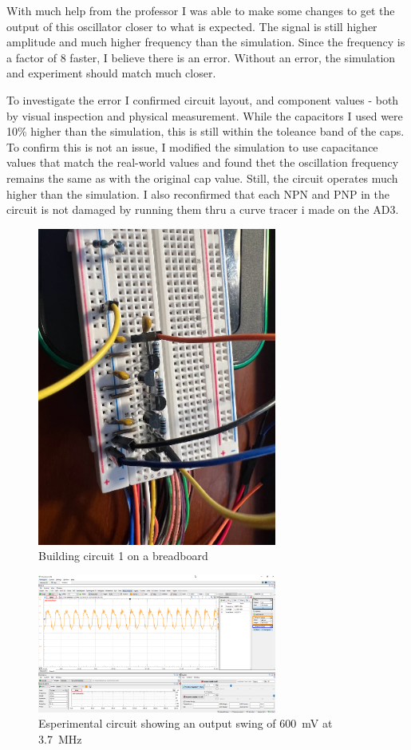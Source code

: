 \documentclass{article}
\begin{document}
	With much help from the professor I was able to make some changes to get the output of this oscillator closer to what is expected. The signal is still higher amplitude and much higher frequency than the simulation. Since the frequency is a factor of 8 faster, I believe there is an error. Without an error, the simulation and experiment should match much closer. 
	
	To investigate the error I confirmed circuit layout, and component values - both by visual inspection and physical measurement. While the capacitors I used were 10\% higher than the simulation, this is still within the toleance band of the caps. To confirm this is not an issue, I modified the simulation to use capacitance values that match the real-world values and found thet the oscillation frequency remains the same as with the original cap value. Still, the circuit operates much higher than the simulation. I also reconfirmed that each NPN and PNP in the circuit is not damaged by running them thru a curve tracer i made on the AD3.
	
	\begin{figure}[H]
	    \centering
	    \includegraphics[width=0.7\textwidth]{circuit1}
	    \caption{Building circuit 1 on a breadboard }
	\end{figure}	
	
	\begin{figure}[H]
	    \centering
	    \includegraphics[width=0.7\textwidth]{w3}
	    \caption{Esperimental circuit showing an output swing of \SI{600}{\mV} at \SI{3.7}{\mega\hertz}}
	\end{figure}	
	
\end{document}
